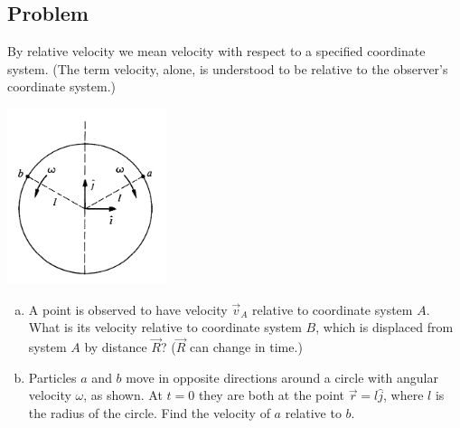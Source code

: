 \documentclass[solutions]{esg8012pset}
\begin{document}
\subsection{Problem}
  By relative velocity we mean velocity with respect to a specified coordinate system. (The term
  velocity, alone, is understood to be relative to the observer's coordinate system.)
  \begin{center}\includegraphics[width=0.35\textwidth]{ps01_2}\end{center}
  \begin{enumerate}[a.]
    \item A point is observed to have velocity $\vec v_A$ relative to coordinate system $A$. What is its
  velocity relative to coordinate system $B$, which is displaced from system $A$ by distance $\vec R$? ($\vec R$ can change in time.)
    \item Particles $a$ and $b$ move in opposite directions around a circle with angular velocity $\omega$,
  as shown. At $t = 0$ they are both at the point $\vec r = l\hat j$, where $l$ is the radius of the circle.
  Find the velocity of $a$ relative to $b$.
  \end{enumerate}
\end{document}
